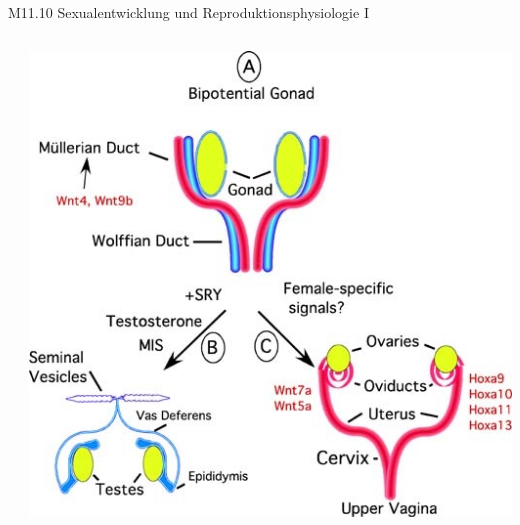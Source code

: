 \documentclass{beamer}
\begin{document}
\begin{frame}{M11.10 Sexualentwicklung und Reproduktionsphysiologie I}
\begin{columns}[c]
\begin{column}{5cm}
\end{column}

\pause

\begin{column}{6cm}

\pause

\begin{center}
\includegraphics[width=\textwidth]{gonad_differentiation.jpg}
\end{center}


\end{column}



\end{columns}

    
\end{frame}
\end{document}
